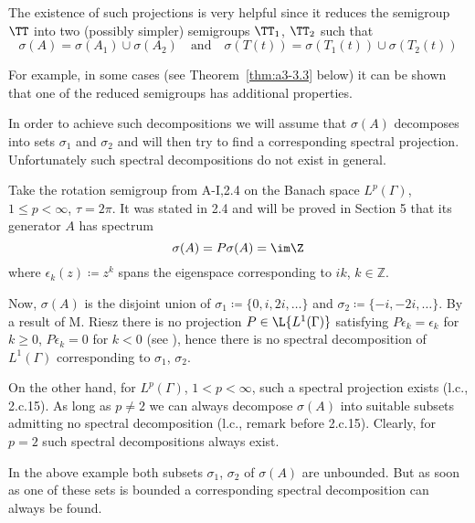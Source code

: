 The existence of such projections is very helpful since it reduces the semigroup $\TT$ into two (possibly simpler) semigroups $\TT_{1}$, $\TT_{2}$ such that
\[
\sigma(A) = \sigma(A_{1}) \cup \sigma(A_{2}) \quad \text{and} \quad \sigma(T(t)) = \sigma(T_{1}(t)) \cup \sigma(T_{2}(t))
\]

For example, in some cases (see Theorem~\ref{thm:a3-3.3} below) it can be shown that one of the reduced semigroups has additional properties.

In order to achieve such decompositions we will assume that $\sigma(A)$ decomposes into sets $\sigma_{1}$ and $\sigma_{2}$ and will then try to find a corresponding spectral projection.
Unfortunately such spectral decompositions do not exist in general.

\begin{example}\label{ex:a3-3.2}

Take the rotation semigroup from A-I,2.4 on the Banach space $L^{p}(\Gamma)$, $1 \leq p < \infty$, $\tau = 2\pi$.
It was stated in 2.4 and will be proved in Section 5 that its generator $A$ has spectrum
\[
\sigma(A) = P\sigma(A) = \im\Z
\]
where $\epsilon_{k}(z) \coloneqq z^{k}$ spans the eigenspace corresponding to $ik$, $k \in \mathbb{Z}$.

Now, $\sigma(A)$ is the disjoint union of $\sigma_{1} \coloneqq \{0,i,2i,\ldots\}$ and $\sigma_{2} \coloneqq \{-i,-2i,\ldots\}$.
By a result of M. Riesz there is no projection $P \in \L{L^{1}(\Gamma)}$ satisfying $P\epsilon_{k} = \epsilon_{k}$ for $k \geq 0$, $P\epsilon_{k} = 0$ for $k < 0$ (see \citet[p.165]{lindenstraustzafriri:1979}), hence there is no spectral decomposition of $L^{1}(\Gamma)$ corresponding to $\sigma_{1}$, $\sigma_{2}$.

On the other hand, for $L^{p}(\Gamma)$, $1 < p < \infty$, such a spectral projection exists (l.c., 2.c.15).
As long as $p \neq 2$ we can always decompose $\sigma(A)$ into suitable subsets admitting no spectral decomposition (l.c., remark before 2.c.15).
Clearly, for $p = 2$ such spectral decompositions always exist.
\end{example}


In the above example both subsets $\sigma_{1}$, $\sigma_{2}$ of $\sigma(A)$ are unbounded.
But as soon as one of these sets is bounded a corresponding spectral decomposition can always be found.


